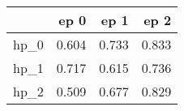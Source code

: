 \begin{tabular}{lrrr}
\toprule
{} &   ep 0 &   ep 1 &   ep 2 \\
\midrule
hp\_0 &  0.604 &  0.733 &  0.833 \\
hp\_1 &  0.717 &  0.615 &  0.736 \\
hp\_2 &  0.509 &  0.677 &  0.829 \\
\bottomrule
\end{tabular}
